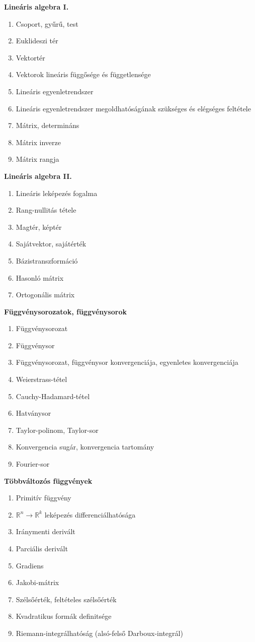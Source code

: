 \documentclass[11pt,a4paper]{article}
\begin{document}
\textbf{Lineáris algebra I.}
\begin{enumerate}
    \item Csoport, gyűrű, test
    \item Euklideszi tér
    \item Vektortér
    \item Vektorok lineáris függősége és függetlensége
    \item Lineáris egyenletrendszer
    \item Lineáris egyenletrendszer megoldhatóságának szükséges és elégséges feltétele
    \item Mátrix, determináns
    \item Mátrix inverze
    \item Mátrix rangja
\end{enumerate}
\textbf{Lineáris algebra II.}
\begin{enumerate}
    \item Lineáris leképezés fogalma
    \item Rang-nullitás tétele
    \item Magtér, képtér
    \item Sajátvektor, sajátérték
    \item Bázistranszformáció
    \item Hasonló mátrix
    \item Ortogonális mátrix
\end{enumerate}
\textbf{Függvénysorozatok, függvénysorok}
\begin{enumerate}
    \item Függvénysorozat
    \item Függvénysor
    \item Függvénysorozat, függvénysor konvergenciája, egyenletes konvergenciája
    \item Weierstrass-tétel
    \item Cauchy-Hadamard-tétel
    \item Hatványsor
    \item Taylor-polinom, Taylor-sor
    \item Konvergencia sugár, konvergencia tartomány
    \item Fourier-sor
\end{enumerate}
\textbf{Többváltozós függvények}
\begin{enumerate}
    \item Primitív függvény
    \item \(\mathbb{R}^n \to \mathbb{R}^k\) leképezés differenciálhatósága 
    \item Iránymenti derivált
    \item Parciális derivált
    \item Gradiens
    \item Jakobi-mátrix
    \item Szélsőérték, feltételes szélsőérték
    \item Kvadratikus formák definitsége
    \item Riemann-integrálhatóság (alsó-felső Darboux-integrál)
\end{enumerate}
\end{document}
